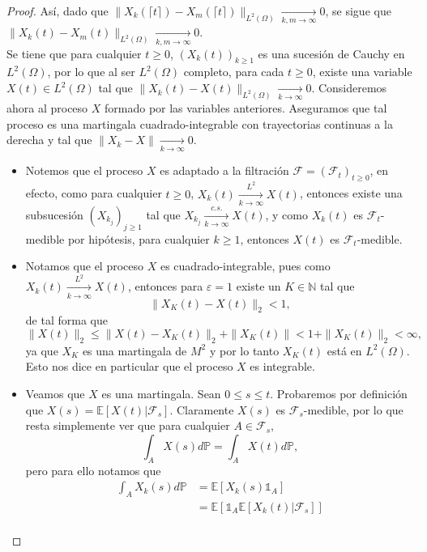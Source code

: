 \documentclass[letterpaper]{article}
\newcommand{\N}{\mathbb N}
\newcommand{\F}{\mathcal{F}}
\renewcommand{\to}{\rightarrow}
\newcommand{\E}{\mathbb{E}}
\renewcommand{\P}{\mathbb{P}}
\newcommand{\1}{\mathds{1}}
\theoremstyle{definition}
\theoremstyle{definition}
\theoremstyle{definition}
\theoremstyle{definition}
\theoremstyle{definition}
\begin{document}
\begin{enumerate}
\begin{proof}
        
        Así, dado que $\|X_k(\lceil t \rceil)-X_m(\lceil t \rceil)\|_{L^2(\Omega)}\xrightarrow[k,m\to \infty]{}0$,
        se sigue que $\|X_k(t)-X_m(t)\|_{L^2(\Omega)}\xrightarrow[k,m\to \infty]{}0$.\\

        Se tiene que para cualquier $t\geq0$, $(X_k(t))_{k\geq1}$ es una sucesión de Cauchy en $L^2(\Omega)$, 
        por lo que al ser $L^2(\Omega)$ completo, para cada $t\geq0$, existe una variable $X(t)\in L^2(\Omega)$ 
        tal que $\|X_k(t)-X(t)\|_{L^2(\Omega)}\xrightarrow[k\to \infty]{}0$. Consideremos ahora
        al proceso $X$ formado por las variables anteriores. Aseguramos que tal proceso
        es una martingala cuadrado-integrable con trayectorias continuas a la derecha y 
        tal que $\|X_k-X\|\xrightarrow[k\to \infty]{}0$. 
        \begin{itemize}
            \item Notemos que el proceso $X$ es adaptado a la filtración $\F=(\F_t)_{t\geq0}$, 
            en efecto, como para cualquier $t\geq0$, $X_k(t)\xrightarrow[k\to \infty]{L^2}X(t)$, entonces
            existe una subsucesión $(X_{k_j})_{j\geq1}$ tal que $X_{k_j}\xrightarrow[k\to \infty]{c.s.}X(t)$, y 
            como $X_k(t)$ es $\F_t$-medible por hipótesis, para cualquier $k\geq1$, entonces $X(t)$ es $\F_t$-medible.
            \item Notamos que el proceso $X$ es cuadrado-integrable, pues como $X_k(t)\xrightarrow[k\to \infty]{L^2}X(t)$, 
            entonces para $\varepsilon=1$ existe un $K\in \N$ tal que 
            \[
            \|X_K(t)-X(t)\|_2<1,    
            \]
            de tal forma que 
            \[
            \|X(t)\|_2\leq \|X(t)-X_K(t)\|_2+\|X_K(t)\|<1+\|X_K(t)\|_2<\infty,    
            \]
            ya que $X_K$ es una martingala de $M^2$ y por lo tanto $X_K(t)$ está en $L^2(\Omega)$. Esto nos dice en 
            particular que el proceso $X$ es integrable.
            \item Veamos que $X$ es una martingala. Sean $0\leq s\leq t$. Probaremos por definición que $X(s)=\E\left[X(t)|\F_s\right]$.
            Claramente $X(s)$ es $\F_s$-medible, por lo que resta simplemente ver que para cualquier $A\in \F_s$, 
            \[
            \int_A X(s)d\P=\int_A X(t) d\P,   
            \]
            pero para ello notamos que 
            \begin{align*}
                \int_AX_k(s)d\P&=\E\left[X_k(s)\1_A\right]\\
                &=\E\left[\1_A\E\left[X_k(t)|\F_s\right]\right]\\

\end{align*}
\end{itemize}
\end{proof}
\end{enumerate}
\end{document}
